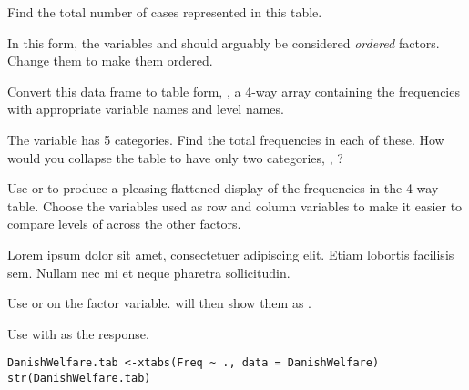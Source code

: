 \documentclass[10pt]{report}
\newcommand{\shortlipsum}{Lorem ipsum dolor sit amet, consectetuer adipiscing elit. Etiam lobortis facilisis sem. Nullam nec mi
et neque pharetra sollicitudin.}
\begin{document}
\begin{Exercises}
  \begin{enumerate*}
    \item Find the total number of cases represented in this table.
    \item In this form, the variables  and 
    should arguably be considered \emph{ordered} factors.  Change them
    to make them ordered.
    \item Convert this data frame to table form, ,
    a 4-way array containing the
    frequencies with appropriate variable names and level names.
    \item The variable  has 5 categories.  Find the total frequencies
    in each of these.  How would you collapse the table to have only
    two categories, , ?
    \item Use  or  to produce a pleasing
    flattened display of the frequencies in the 4-way table.  Choose the
    variables used as row and column variables to make it easier to compare
    levels of  across the other factors.
  \end{enumerate*}
\begin{answer}[Hint]
	\begin{enumerate*}
		\item \shortlipsum
		\item Use  or  on the factor variable.   will then show them as .
		\item Use  with  as the response.
		\begin{verbatim}
DanishWelfare.tab <-xtabs(Freq ~ ., data = DanishWelfare)
str(DanishWelfare.tab)
		\end{verbatim}
	\end{enumerate*}
\end{answer}

\end{Exercises}
\end{document}
